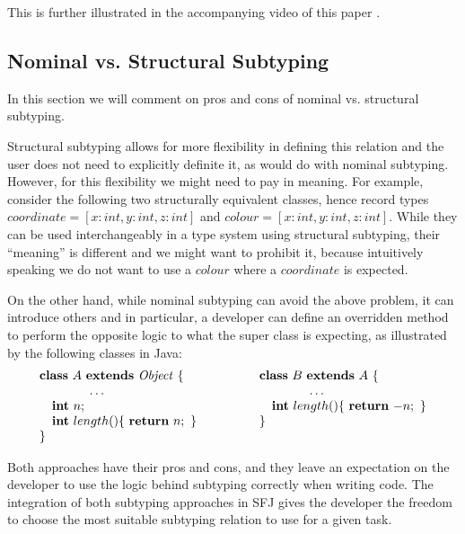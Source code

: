 \documentclass[runningheads]{llncs}
\begin{document}
This is further illustrated in the accompanying video of this paper \cite{UD20}.

\subsection{Nominal vs. Structural Subtyping}
\label{sec:nominal}
In this section we will comment on pros and cons of nominal vs. structural subtyping.

Structural subtyping allows for more flexibility in defining this relation and the user does not need to explicitly definite it, as would do with nominal subtyping.
However, for this flexibility we might need to pay in meaning.
For example, consider the following two structurally equivalent classes, hence record types
$coordinate = [x:int, y:int, z:int]$ and $colour = [x:int, y:int, z:int]$.
While they can be used interchangeably in a type system using structural subtyping, their ``meaning'' is different and we might want to prohibit it, because intuitively speaking we do not want to use a $colour$ where a $coordinate$ is expected.

On the other hand, while nominal subtyping can avoid the above problem, it can introduce others and in particular, a developer can define an overridden method to perform the opposite logic to what the super class is expecting, as illustrated by the following classes in Java:
\begin{equation*}
    \begin{array}{ll}
        \mathbf{class} \  A \ \mathbf{extends }\  \mathit{Object}\ \{
         &
            \qquad
            \mathbf{class} \  B \ \mathbf{extends }\  A\ \{
                \\
               \qquad \qquad\ldots \qquad
         &
                \qquad\qquad\qquad \ldots
                \\
                \quad \textbf{int}\ n;\qquad
         &
                \qquad\quad \textbf{int}\ length()\{\ \mathbf{return}\ {-n};\ \}
                \\
                \quad \textbf{int}\ length()\{\ \mathbf{return}\ {n};\ \}\qquad
         &
                \qquad\}
                \\   \}
    \end{array}
\end{equation*}

Both approaches have their pros and cons, and they leave an expectation on the developer to use the logic behind subtyping correctly when writing code.
The integration of both subtyping approaches in SFJ gives the developer the freedom to choose the most suitable subtyping relation to use for a given task.
\end{document}
